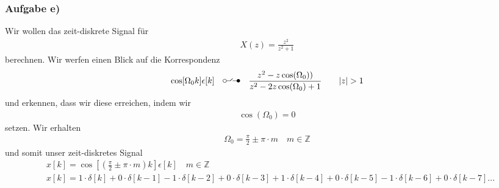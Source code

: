 \documentclass[11pt,a4paper,DIV=12]{scrartcl}
\renewcommand{\ztransf}{\mbox{\setlength{\unitlength}{0.1em}%
                            \begin{picture}(20,10)%
                              \put(2,3){\circle{4}}%
                              \put(4,3){\line(1,0){4.75}}%
                              \multiput(8.625,3.15)(0.25,0.25){11}{%
                                \makebox(0,0){\rmfamily\tiny .}}%
                              \put(17,3){\line(-1,0){5.75}}%
                              \put(18,3){\circle*{4}}%
                            \end{picture}%
                           }
                      }
\begin{document}
\subsubsection{Aufgabe e)}
Wir wollen das zeit-diskrete Signal für
\begin{align}
	X(z)=\frac{z^2}{z^2+1}
\end{align}
berechnen.
Wir werfen einen Blick auf die Korrespondenz
\begin{align}
	\cos [\Omega_0k]\epsilon[k]\quad\ztransf\quad \frac{z^2-z\cos(\Omega_0))}{z^2-2z\cos(\Omega_0)+1}\quad\quad |z| > 1
\end{align}
und erkennen, dass wir diese erreichen, indem wir
\begin{align}
	\cos(\Omega_0)=0
\end{align}
setzen.
Wir erhalten
\begin{align}
	\Omega_0 = \frac{\pi}{2} \pm \pi \cdot m \quad m \in \mathbb{Z}
\end{align}
und somit unser zeit-diskretes Signal
\begin{align}
	&x[k]=\cos[(\frac{\pi}{2}\pm \pi\cdot m)k]\epsilon[k]\quad m \in \mathbb{Z}\\
	&x[k] = 1\cdot\delta[k] + 0\cdot \delta[k-1] -1\cdot \delta[k-2] + 0\cdot \delta[k-3] + 1\cdot \delta[k-4] + 0\cdot \delta[k-5] -1\cdot \delta[k-6] + 0\cdot \delta[k-7] ...
\end{align}
\end{document}
